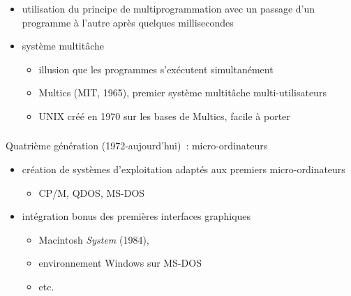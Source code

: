 \begin{frame}
\frametitle{\insertsubsection}
\begin{itemize}
  \item utilisation du principe de multiprogrammation avec un passage d'un programme à l'autre après
    quelques millisecondes
  \item[\ding{212}] système \alert{multitâche}
    \begin{itemize}
    \item illusion que les programmes s'exécutent simultanément
    \item Multics (MIT, 1965), premier système multitâche multi-utilisateurs 
    \item UNIX créé en 1970 sur les bases de Multics, facile à porter 
    \end{itemize}
  \end{itemize}
\end{frame}
  
\begin{frame}
  \frametitle{\insertsubsection}
  \alert{Quatrième génération} (1972-aujourd'hui)~: micro-ordinateurs
  \vspace{0.2cm}
  \begin{itemize}
    \item création de systèmes d'exploitation adaptés aux premiers micro-ordinateurs
      \begin{itemize}
      \item CP/M, QDOS, MS-DOS
      \end{itemize}
      \vspace{0.2cm}
    \item intégration bonus des premières interfaces graphiques  
      \begin{itemize}
      \item Macintosh \emph{System} (1984),
      \item environnement Windows sur MS-DOS
      \item etc. 
      \end{itemize}
  \end{itemize}
\end{frame}

